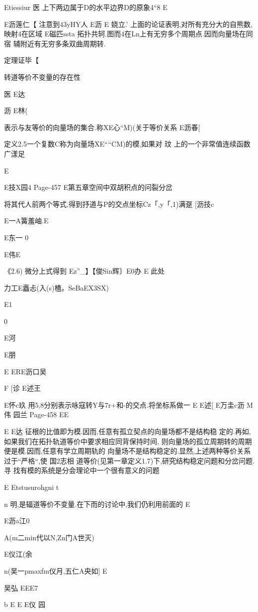 {{{{{Etiessiur
医
上下两边属于D的水平边界D的原象4“8%
E

E沥莲仁【
注意到43yHY人%
E沥
E
娆立.'
上面的论证表明,对所有充分大的自熊数,映射4在区域
E磁匹ssta
拓扑共轲.图而4在Ln上有无穷多个周期点.因而向量场在同宿
辅附近有无穷多条双曲周期转.

定理证毕【

转道等价不变量的存在性

医
E达

沥
E林(

表示与友等价的向量场的集合.称XE心“M)(关于等价关系
E沥春[

定义2.5一个复数C称为向量场XE““CM)的模,如果对
玟
上的一个非常值连续函数广漾足

E

E技X园4
Page-457
E第五章空间中双胡积点的问裂分岔

将其代人前两个等式,得到抒道与P的交点坐标Cz「,y「,1)满趸
[沥技c

E一A簧羞岫.E

E东一
0

E伟E

《2.6)
微分上式得到
Ez”_】【俊Sin辉〕E0办
E
此处

力工E矗忐(入(s)楂。SeBaEX3SX)

E1

0

E河

E朋

E
ERE沥口吴

F
[诊
E述王

E怀c玖
用5,8分别表示咏寇转Y与7r+和-的交点.将坐标系做一
E
E述[
E万圭c沥
M伟
园兰
Page-458
EE

E
E达
征根的比值即为模.因而,任意有孤立契点的向量场都不是结构稳
定的.再如,如果我们在拓扑轨道等价中要求相应同背保持时间,
则向量场的孤立周期转的周期便是模.因而,任意有学立周期轨的
向量场不是结构稳定的.显然,上述两种等价关系过于“严格“,使
国2志相
道等价(见第一章定义1.7)下,研究结构稳定问题和分岔问题.寻
找有模的系统是分会理论中一个很有意义的问题

E
Etstusurohgni
t

n
明,是辐道等价不变量.在下而的讨论中,我们仍利用前面的
E

E沥a江0

A(m二min代以N,Zn门A世灭)

E仪江(余

n(吴一pmaxfm仪月,五仁A央如]
E

吴弘
EEE7

b
E
E
E仪
园

}}}}}
